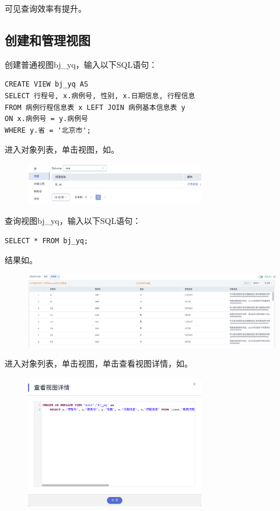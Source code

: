 \documentclass[lang=cn,11pt,a4paper,cite=authornum]{paper}
\begin{document}
可见查询效率有提升。

\subsection{创建和管理视图}

创建普通视图bj\_yq，输入以下SQL语句：
\begin{code}
\begin{verbatim}
CREATE VIEW bj_yq AS
SELECT 行程号, x.病例号, 性别, x.日期信息, 行程信息
FROM 病例行程信息表 x LEFT JOIN 病例基本信息表 y
ON x.病例号 = y.病例号
WHERE y.省 = '北京市';
\end{verbatim}
\end{code}

进入对象列表，单击视图，如。
\begin{figure}[!htb]
    \centering
    \includegraphics[width=0.7\textwidth]{./images/res21.png}
    \caption{\label{fig:res21}}
\end{figure}

查询视图bj\_yq，输入以下SQL语句：
\begin{code}
\begin{verbatim}
SELECT * FROM bj_yq;
\end{verbatim}
\end{code}

结果如。
\begin{figure}[!htb]
    \centering
    \includegraphics[width=\textwidth]{./images/res22.png}
    \caption{\label{fig:res22}}
\end{figure}

进入对象列表，单击视图，单击查看视图详情，如。
\begin{figure}[!htb]
    \centering
    \includegraphics[width=0.7\textwidth]{./images/res23.png}
    \caption{\label{fig:res23}}
\end{figure}
\end{document}
